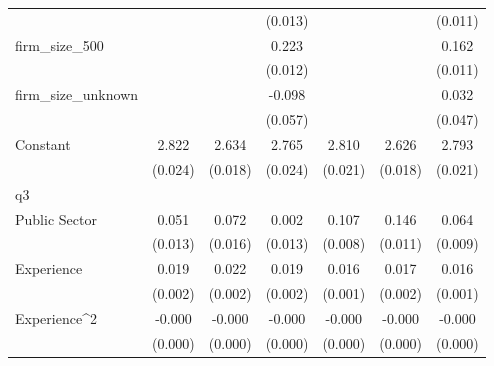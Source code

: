{\begin{tabular}{l*{6}{c}}
                    &                     &                     &     (0.013)         &                     &                     &     (0.011)         \\
firm\_size\_500       &                     &                     &       0.223\sym{***}&                     &                     &       0.162\sym{***}\\
                    &                     &                     &     (0.012)         &                     &                     &     (0.011)         \\
firm\_size\_unknown   &                     &                     &      -0.098\sym{*}  &                     &                     &       0.032         \\
                    &                     &                     &     (0.057)         &                     &                     &     (0.047)         \\
Constant            &       2.822\sym{***}&       2.634\sym{***}&       2.765\sym{***}&       2.810\sym{***}&       2.626\sym{***}&       2.793\sym{***}\\
                    &     (0.024)         &     (0.018)         &     (0.024)         &     (0.021)         &     (0.018)         &     (0.021)         \\
\hline
q3                  &                     &                     &                     &                     &                     &                     \\
Public Sector       &       0.051\sym{***}&       0.072\sym{***}&       0.002         &       0.107\sym{***}&       0.146\sym{***}&       0.064\sym{***}\\
                    &     (0.013)         &     (0.016)         &     (0.013)         &     (0.008)         &     (0.011)         &     (0.009)         \\
Experience          &       0.019\sym{***}&       0.022\sym{***}&       0.019\sym{***}&       0.016\sym{***}&       0.017\sym{***}&       0.016\sym{***}\\
                    &     (0.002)         &     (0.002)         &     (0.002)         &     (0.001)         &     (0.002)         &     (0.001)         \\
Experience^{2}      &      -0.000\sym{***}&      -0.000\sym{***}&      -0.000\sym{***}&      -0.000\sym{***}&      -0.000\sym{***}&      -0.000\sym{***}\\
                    &     (0.000)         &     (0.000)         &     (0.000)         &     (0.000)         &     (0.000)         &     (0.000)         \\

\end{tabular}}
